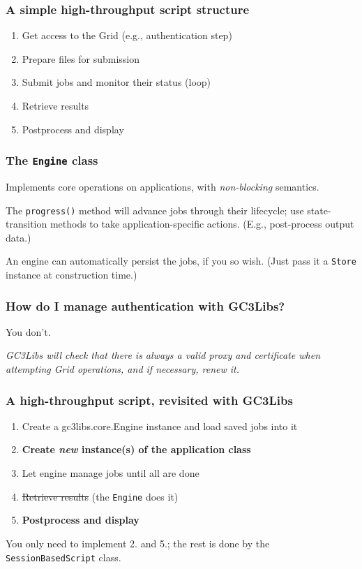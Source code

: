 \documentclass[presentation]{beamer}
\begin{document}
\begin{frame}
  \frametitle{A simple high-throughput script structure}
  \label{sec:16}
  
  \begin{enumerate}
  \item Get access to the Grid (e.g., authentication step)
  \item Prepare files for submission
  \item Submit jobs and monitor their status (loop)
  \item Retrieve results
  \item Postprocess and display
  \end{enumerate}
\end{frame}

\begin{frame}
\frametitle{The \texttt{Engine} class}
\label{sec:20}

  Implements core operations on applications, with \emph{non-blocking}
  semantics.

  The \texttt{progress()} method will advance jobs through their lifecycle; 
  use state-transition methods to take application-specific actions.
  (E.g., post-process output data.)
  
  An engine can automatically persist the jobs, if you so wish.
  (Just pass it a \texttt{Store} instance at construction time.)
\end{frame}

\begin{frame}
  \frametitle{How do I manage authentication with GC3Libs?}
  \label{sec:18}
  
  You don't.
  
  \emph{GC3Libs will check that there is always a valid proxy and
    certificate when attempting Grid operations, and if necessary, renew
    it.}
\end{frame}

\begin{frame}
  \frametitle{A high-throughput script, revisited with GC3Libs}
  \label{sec:21}

  \begin{enumerate}
  \item Create a gc3libs.core.Engine instance and load saved jobs into it
  \item \textbf{Create \emph{new} instance(s) of the application class}
  \item Let engine manage jobs until all are done
  \item \st{Retrieve results} (the \texttt{Engine} does it)
  \item \textbf{Postprocess and display}
  \end{enumerate}
  
  You only need to implement 2. and 5.; the rest is done by the
  \texttt{SessionBasedScript} class.
\end{frame}
\end{document}
